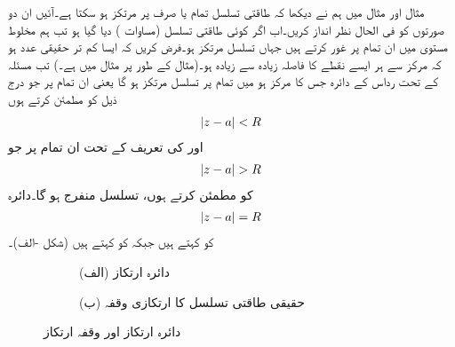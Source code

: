 مثال  اور مثال  میں ہم نے دیکھا کہ طاقتی تسلسل تمام  یا صرف  پر مرتکز ہو سکتا ہے۔آئیں ان دو صورتوں کو فی الحال نظر انداز کریں۔اب اگر کوئی  طاقتی تسلسل (مساوات ) دیا گیا ہو تب ہم مخلوط مستوی میں ان تمام  پر غور کرتے ہیں جہاں تسلسل مرتکز ہو۔فرض کریں کہ  ایسا کم تر حقیقی عدد ہو کہ مرکز  سے ہر ایسے نقطے کا فاصلہ زیادہ سے زیادہ  ہو۔(مثال کے طور پر مثال  میں  ہے۔)  تب مسئلہ  کے تحت رداس  کے دائرہ  جس کا مرکز  ہو میں تمام  پر تسلسل مرتکز ہو گا یعنی ان تمام  پر جو درج ذیل کو مطمئن کرتے ہوں
\begin{align}\label{مساوات_ٹیلر_رداس_مرکوزیت}
\abs{z-a}<R
\end{align}
اور  کی تعریف کے تحت ان تمام  پر جو 
\begin{align*}
\abs{z-a}>R
\end{align*}
کو مطمئن کرتے ہوں، تسلسل منفرج ہو گا۔دائرہ
\begin{align*}
\abs{z-a}=R
\end{align*}
کو  کہتے ہیں جبکہ  کو  کہتے ہیں (شکل -الف)۔
\begin{figure}
\centering
\begin{subfigure}{0.5\textwidth}
\centering
{}
\caption*{(الف) دائرہ ارتکاز}
\end{subfigure}%
\begin{subfigure}{0.5\textwidth}
\centering
{}
\caption*{(ب) حقیقی طاقتی تسلسل کا ارتکازی وقفہ}
\end{subfigure}%
\caption{دائرہ ارتکاز اور وقفہ ارتکاز}
\label{شکل_ٹیلر_دائرہ_مرکوزیت_رداس_مرکوزیت}
\end{figure}

